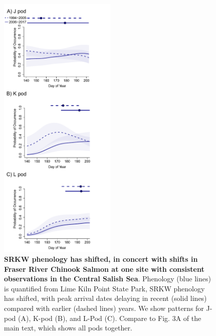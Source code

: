 \documentclass{article}
\begin{document}
\newpage
\begin{figure}[!hp]
\includegraphics[width=0.5\textwidth]{../analyses/orcaphen/figures/orcachinphenoverlap_allpods2006.pdf}
\caption{\textbf{SRKW phenology has shifted, in concert with shifts in Fraser River Chinook Salmon at one site with consistent observations in the Central Salish Sea}. Phenology (blue lines) is quantified from Lime Kiln Point State Park, SRKW phenology has shifted, with peak arrival dates delaying in recent (solid lines) compared with earlier (dashed lines) years. We show patterns for J-pod (A), K-pod (B), and L-Pod (C). Compare to Fig. 3A of the main text, which shows all pods together. }
\label{fig:KLchin}
\end{figure}
\end{document}
